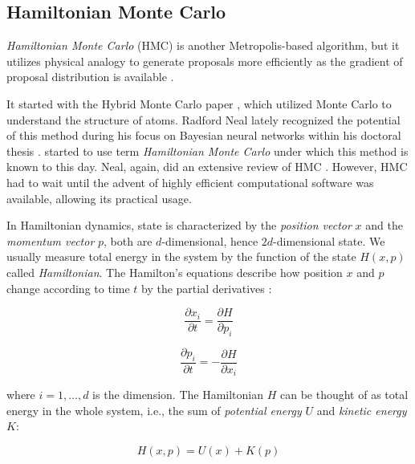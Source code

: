 \documentclass[
  digital, %
  oneside, %
  lof,     %
  lot,     %
]{fithesis4}
\begin{document}

\subsection{Hamiltonian Monte Carlo}

\textit{Hamiltonian Monte Carlo} (HMC) is another Metropolis-based algorithm, but it utilizes physical analogy to generate proposals more efficiently as the gradient of proposal distribution is available \cite{betancourt2018}.

It started with the Hybrid Monte Carlo paper \cite{duane1987}, which utilized Monte Carlo to understand the structure of atoms. 
Radford Neal lately recognized the potential of this method during his focus on Bayesian neural networks within his doctoral thesis \cite{neal1995}. 
\cite{mackay2003} started to use term \textit{Hamiltonian Monte Carlo} under which this method is known to this day.
Neal, again, did an extensive review of HMC \cite{neal2011}.
However, HMC had to wait until the advent of highly efficient computational software was available, allowing its practical usage.

In Hamiltonian dynamics, state is characterized by the \textit{position vector} $x$ and the \textit{momentum vector} $p$, both are $d$-dimensional, hence $2d$-dimensional state.
We usually measure total energy in the system by the function of the state $H(x, p)$ called \textit{Hamiltonian}.
The Hamilton’s equations describe how position $x$ and $p$ change according to time $t$ by the partial derivatives \cite{neal2011}:

\begin{equation}
  \frac{\partial x_i}{\partial t} = \frac{\partial H}{\partial p_i}
\end{equation}

\begin{equation}
  \frac{\partial p_i}{\partial t} = - \frac{\partial H}{\partial x_i}
\end{equation}

where $i = 1, \dots, d$ is the dimension.
The Hamiltonian $H$ can be thought of as total energy in the whole system, i.e., the sum of \textit{potential energy} $U$ and \textit{kinetic energy} $K$:

\begin{equation}
  H(x, p) = U(x) + K(p)
\end{equation}
\end{document}
